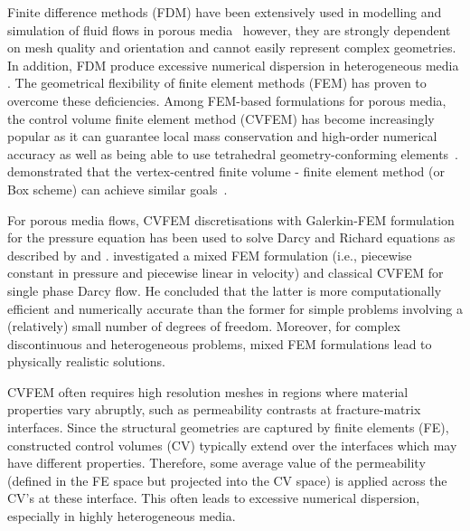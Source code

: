 \documentclass[preprint,authoryear,12pt]{elsarticle}
\begin{document}
Finite difference methods (FDM) have been extensively used in modelling and simulation of fluid flows in porous media~\citep{aziz_1986, chen_1997, chen_2005} however, they are strongly dependent on mesh quality and orientation and cannot easily represent complex geometries. In addition, FDM produce excessive numerical dispersion in heterogeneous media \citep{chavent_1986}. The geometrical flexibility of finite element methods (FEM) has proven to overcome these deficiencies. Among FEM-based formulations for porous media, the control volume finite element method (CVFEM) has become increasingly popular as it can guarantee local mass conservation and high-order numerical accuracy as well as being able to use tetrahedral geometry-conforming elements~\citep{forsyth_1990, cordazzo_2004, fung_1992, geiger_2004, cumming_2011, hurtado_2007}.  \citet{huber_2000} demonstrated that the vertex-centred finite volume - finite element method (or Box scheme) can achieve similar goals~\citep[see also][]{helmig_1997}.

For porous media flows, CVFEM discretisations with Galerkin-FEM formulation for the pressure equation has been used to solve Darcy and Richard equations as described by \citet{fung_1992} and \citet{cumming_2011}. \citet{durlofsky_1993,durlofsky_1994} investigated a mixed FEM formulation (i.e., piecewise constant in pressure and piecewise linear in velocity) and classical CVFEM for single phase Darcy flow. He concluded that the latter is more computationally efficient and numerically accurate than the former for simple problems involving a (relatively) small number of degrees of freedom. Moreover, for complex discontinuous and heterogeneous problems, mixed FEM formulations lead to physically realistic solutions.

\medskip

CVFEM often requires high resolution meshes in regions where material properties vary abruptly, such as permeability contrasts at fracture-matrix interfaces. Since the structural geometries are captured by finite elements (FE), constructed control volumes (CV) typically extend over the interfaces which may have different properties. Therefore, some average value of the permeability (defined in the FE space but projected into the CV space) is applied across the CV's at these interface. This often leads to excessive numerical dispersion, especially in highly heterogeneous media. 
\end{document}
